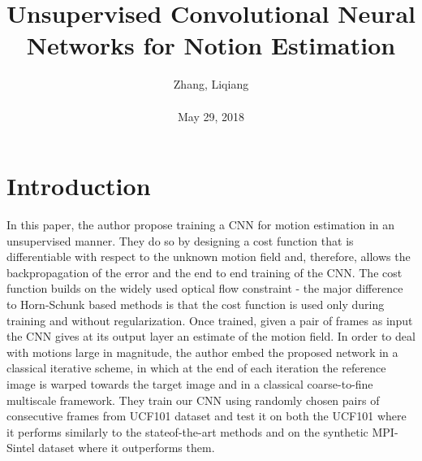 \documentclass[10pt,twocolumn,letterpaper]{article}
\title{\textbf{Unsupervised Convolutional Neural Networks for Notion Estimation}}
\author{Zhang, Liqiang\\\\May 29, 2018}
\begin{document}
\maketitle
\par
\section{Introduction}
\par
In this paper, the author propose training a CNN for motion estimation in an unsupervised manner. They do so by designing a cost function that is differentiable with respect to the unknown motion field and, therefore, allows the backpropagation of the error and the end to end training of the CNN. The cost function builds on the widely used optical flow constraint - the major difference to Horn-Schunk based methods is that the cost function is used only during training and without regularization. Once trained, given a pair of frames as input the CNN gives at its output layer an estimate of the motion field. In order to deal with motions large in magnitude, the author embed the proposed network in a classical iterative scheme, in which at the end of each iteration the reference image is warped towards the target image and in a classical coarse-to-fine multiscale framework. They train our CNN using randomly chosen pairs of consecutive frames from UCF101 dataset and test it on both the UCF101 \cite{Brox2004High} where it performs similarly to the stateof-the-art methods and on the synthetic MPI-Sintel dataset where it outperforms them.
\end{document}
